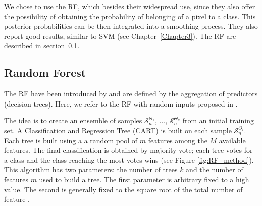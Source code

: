 We chose to use the RF, which besides their widespread use, since they also offer the possibility of obtaining the probability of belonging of a pixel to a class. This posterior probabilities can be then integrated into a smoothing process. They also report good results, similar to SVM (see Chapter~\ref{Chapter3}). The RF are described in section~\ref{sec:C1_RF}.

\subsection{Random Forest}
\label{sec:C1_RF}
The RF have been introduced by \cite{breiman2001random} and are defined by the aggregation of predictors (decision trees). Here, we refer to the RF with random inputs proposed in \cite{breiman2001random}.

The idea is to create an ensemble of samples $\mathcal{S}_{n}^{\Theta_{1}}$, ..., $\mathcal{S}_{n}^{\Theta_{k}}$ from an initial training set. A Classification and Regression Tree (CART) \citep{breiman1984classification} is built on each sample $\mathcal{S}_{n}^{\Theta_{i}}$. Each tree is built using a a random pool of $m$ features among the $M$ available features. The final classification is obtained by majority vote; each tree votes for a class and the class reaching the most votes wins (see Figure \ref{fig:RF_method}). This algorithm has two parameters: the number of trees $k$ and the number of features $m$ used to build a tree. The first parameter is arbitrary fixed to a high value. The second is generally fixed to the square root of the total number of feature \citep{gislason2006random}.

